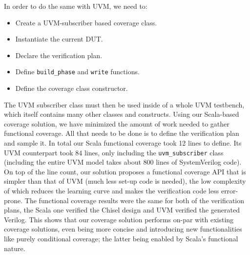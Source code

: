 \documentclass[conference]{IEEEtran}
\newcommand{\todo}[1]{{\color{olive} TODO: #1}}
\newcommand{\martin}[1]{{\color{blue} Martin: #1}}
\begin{document}
In order to do the same with UVM, we need to:  
\begin{itemize}
    \item Create a UVM-subscriber based coverage class.
    \item Instantiate the current DUT. %
    \item Declare the verification plan.
    \item Define \texttt{build\_phase} and \texttt{write} functions.
    \item Define the coverage class constructor.
\end{itemize}  
The UVM subscriber class must then be used inside of a whole UVM testbench, which itself contains many other classes and constructs.
Using our Scala-based coverage solution, we have minimized the amount of work needed to gather functional coverage. 
All that needs to be done is to define the verification plan and sample it.
In total our Scala functional coverage took 12 lines to define.
Its UVM counterpart took 84 lines, only including the \texttt{uvm\_subscriber} class (including the entire UVM model takes about 800 lines of SystemVerilog code). %
On top of the line count, our solution proposes a functional coverage API that is simpler than that of UVM (much less set-up code is needed), the low complexity of which reduces the learning curve and makes the verification code less error-prone.
The functional coverage results were the same for both of the verification plans, the Scala one verified the Chisel design and UVM verified the generated Verilog.
This shows that our coverage solution performs on-par with existing coverage solutions, even being more concise and introducing new functionalities like purely conditional coverage; the latter being enabled by Scala's functional nature. 
\end{document}
